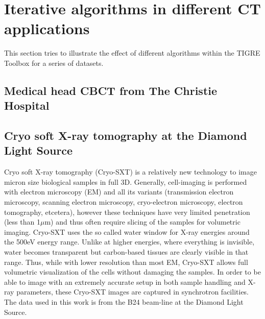 \FloatBarrier
\section{Iterative algorithms in different CT applications}
This section tries to illustrate the effect of different algorithms within the TIGRE Toolbox for a series of datasets. 
\subsection{Medical head CBCT from  The Christie Hospital}
\subsection{Cryo soft X-ray tomography at the Diamond Light Source}

Cryo soft X-ray tomography (Cryo-SXT) is a relatively new\cite{carzaniga2014cryo} technology to image micron size biological samples in full 3D. Generally, cell-imaging is performed with electron microscopy (EM) and all its variants (transmission electron microscopy, scanning electron microscopy, cryo-electron microscopy, electron tomography, etcetera), however these techniques have very limited penetration (less than 1$\mu$m) and thus often require slicing of the samples for volumetric imaging. Cryo-SXT uses the so called water window for X-ray energies around the 500eV energy range. Unlike at higher energies, where everything is invisible, water becomes transparent but carbon-based tissues are clearly visible in that range. Thus, while with lower resolution than most EM, Cryo-SXT allows full volumetric visualization of the cells without damaging the samples. In order to be able to image with an extremely accurate setup in both sample handling and X-ray parameters, these Cryo-SXT images are captured in synchrotron facilities. The data used in this work is from the B24 beam-line at the Diamond Light Source.

